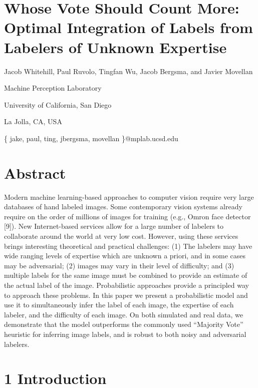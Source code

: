 \documentclass[
]{article}
\author{}
\date{}
\begin{document}
\section{Whose Vote Should Count More: Optimal Integration of Labels
from Labelers of Unknown
Expertise}\label{whose-vote-should-count-more-optimal-integration-of-labels-from-labelers-of-unknown-expertise}

Jacob Whitehill, Paul Ruvolo, Tingfan Wu, Jacob Bergsma, and Javier
Movellan

Machine Perception Laboratory

University of California, San Diego

La Jolla, CA, USA

\{ jake, paul, ting, jbergsma, movellan \}@mplab.ucsd.edu

\section{Abstract}\label{abstract}

Modern machine learning-based approaches to computer vision require very
large databases of hand labeled images. Some contemporary vision systems
already require on the order of millions of images for training (e.g.,
Omron face detector {[}9{]}). New Internet-based services allow for a
large number of labelers to collaborate around the world at very low
cost. However, using these services brings interesting theoretical and
practical challenges: (1) The labelers may have wide ranging levels of
expertise which are unknown a priori, and in some cases may be
adversarial; (2) images may vary in their level of difficulty; and (3)
multiple labels for the same image must be combined to provide an
estimate of the actual label of the image. Probabilistic approaches
provide a principled way to approach these problems. In this paper we
present a probabilistic model and use it to simultaneously infer the
label of each image, the expertise of each labeler, and the difficulty
of each image. On both simulated and real data, we demonstrate that the
model outperforms the commonly used ``Majority Vote'' heuristic for
inferring image labels, and is robust to both noisy and adversarial
labelers.

\section{1 Introduction}\label{introduction}
\end{document}
